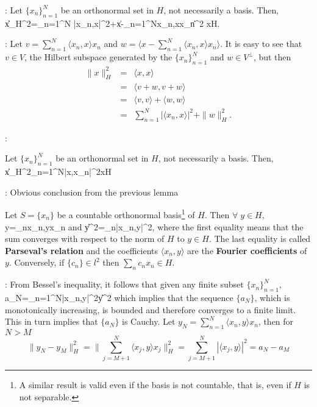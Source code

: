 \blem[Pythagoras]:
\label{lem8.1}
Let $\{x_n\}_{n=1}^N$ be an orthonormal set in
$H$, not necessarily a basis. Then,
\elem
\beq
\|x\|_H^2=\sum_{n=1}^N |\langle x_n,x\rangle|^2+\|x-\sum_{n=1}^N\langle x_n,x\rangle x_n\|^2\;\;\;
\forall\;\;x\in H.
\eeq

\pru: 
Let $v = \sum_{n=1}^N \langle x_n,x\rangle x_n$ and $w=\langle x - \sum^N_{n=1}
\langle x_n,x\rangle x_n\rangle$.
It is easy to see that $v\in V$, the Hilbert subspace generated by the
$\{x_n\}^N_{n=1} $ and $w \in V^{\perp}$, but then 
\begin{eqnarray*}
\|x\|^2_H &=& \langle x,x\rangle \\
                 &=& \langle v+w,v+w\rangle \\
                 &=& \langle v,v\rangle+\langle w,w\rangle \\
                 &=&\sum_{n=1}^N |\langle x_n,x\rangle|^2+\|w\|^2_H.
\end{eqnarray*}
\epru 



:
\label{lem8.2}

Let $\{x_n\}_{n=1}^N$ be an orthonormal set in
$H$, not necessarily a basis. Then,
\beq
\|x\|_H^2\geq\sum_{n=1}^N|\langle x,x_n\rangle|^2\;\;\;\forall\;x\in H
\eeq
\elem

\pru: 
Obvious conclusion from the previous lemma 
\epru

\blem 
\label{lem7.5}
Let $S = \{x_n\}$ be a countable orthonormal basis\footnote{A similar result
is valid even if the basis is not countable,
that is, even if $H$ is not separable.} of $H$.
Then $\forall \; y \in H$,
\beq
y=\sum_n\langle x_n,y\rangle x_n
\eeq
and
\beq
\|y\|^2=\sum_n|\langle x_n,y\rangle|^2,
\eeq
where the first equality means that the sum converges with respect
to the norm of $H$ to $y \in H$. The last equality is called 
{\bf Parseval's relation} and the coefficients $\langle x_n,y\rangle$ are the 
{\bf Fourier coefficients} of $y$. 
Conversely, if $\{c_n\} \in l^2$ then $\sum_n c_nx_n \in H$.
\elem

\espa
\pru:
From Bessel's inequality, it follows that given any
finite subset $\{x_n\}^N_{n=1}$,
\beq
a_N=\sum_{n=1}^N|\langle x_n,y\rangle|^2\leq\|y\|^2
\eeq
which implies that the sequence $\{a_N\}$, which is monotonically
increasing, is bounded and therefore converges to a finite limit.
This in turn implies that $\{a_N\}$ is Cauchy.
Let $y_N = \sum_{n=1}^N \langle x_n,y\rangle x_n$, then for $N> M$
\[
\|y_N-y_M\|^2_H=\|\sum_{j=M+1}^N \langle x_j,y\rangle x_j\|^2_H =\sum_{j=M+1}^N
|\langle x_j,y\rangle|^2=a_N-a_M 
\]

